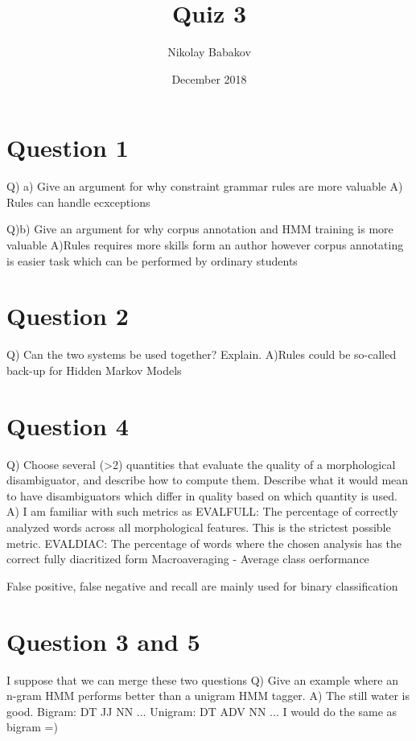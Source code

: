 \documentclass{article}
\title{Quiz 3}
\author{Nikolay Babakov}
\date{December 2018}
\begin{document}
\maketitle

\section{Question 1}
Q) a) Give an argument for why constraint grammar rules are more valuable
A) Rules can handle ecxceptions

Q)b) Give an argument for why corpus annotation and HMM training is more valuable
A)Rules requires more skills form an author however corpus annotating is easier task which can be performed by ordinary students

\section{Question 2}
Q) Can the two systems be used together? Explain.
A)Rules could be so-called back-up for Hidden Markov Models

\section{Question 4}
Q) Choose several (>2) quantities that evaluate the quality of a morphological disambiguator, and describe how to compute them. Describe what it would mean to have disambiguators which differ in quality based on which quantity is used.
A) 
I am familiar with such metrics as
EVALFULL: The percentage of correctly analyzed words across all morphological features. This is the strictest possible metric.
EVALDIAC: The percentage of words where the chosen analysis has the correct fully diacritized form
Macroaveraging - Average class oerformance

False positive, false negative and recall are mainly used for binary classification

\section{Question 3 and 5}
I suppose that we can merge these two questions
Q) Give an example where an n-gram HMM performs better than a unigram HMM tagger.
A) The still water is good.
Bigram: DT JJ NN ...
Unigram: DT ADV NN ...
I would do the same as bigram =)
\end{document}
